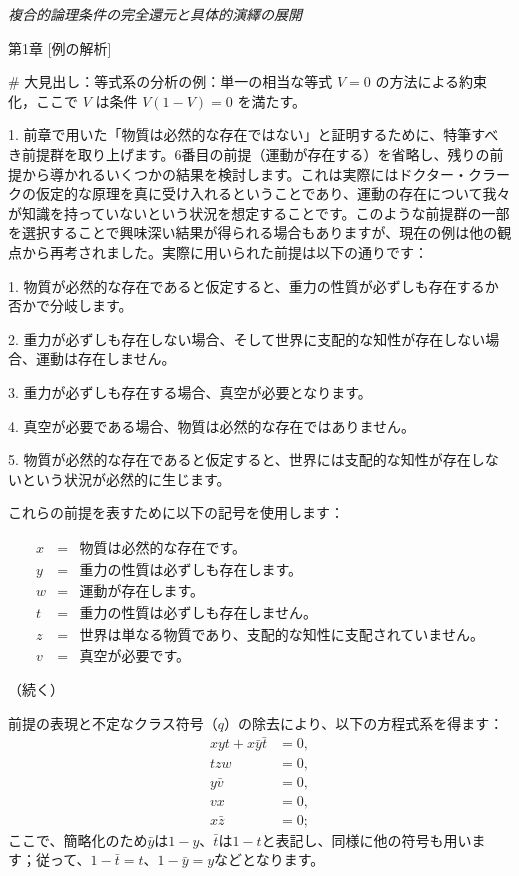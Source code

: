 \documentclass[a4paper,11pt,openany]{ltjsbook}
\begin{document}
\begin{center}
\large\textit{複合的論理条件の完全還元と具体的演繹の展開}
\end{center}
\vspace{4mm}

第1章 [例の解析]

\# 大見出し：等式系の分析の例：単一の相当な等式 \( V = 0 \) の方法による約束化，ここで \( V \) は条件 \( V(1-V) = 0 \) を満たす。

1. 前章で用いた「物質は必然的な存在ではない」と証明するために、特筆すべき前提群を取り上げます。6番目の前提（運動が存在する）を省略し、残りの前提から導かれるいくつかの結果を検討します。これは実際にはドクター・クラークの仮定的な原理を真に受け入れるということであり、運動の存在について我々が知識を持っていないという状況を想定することです。このような前提群の一部を選択することで興味深い結果が得られる場合もありますが、現在の例は他の観点から再考されました。実際に用いられた前提は以下の通りです：

1. 物質が必然的な存在であると仮定すると、重力の性質が必ずしも存在するか否かで分岐します。

2. 重力が必ずしも存在しない場合、そして世界に支配的な知性が存在しない場合、運動は存在しません。

3. 重力が必ずしも存在する場合、真空が必要となります。

4. 真空が必要である場合、物質は必然的な存在ではありません。

5. 物質が必然的な存在であると仮定すると、世界には支配的な知性が存在しないという状況が必然的に生じます。

これらの前提を表すために以下の記号を使用します：

\begin{eqnarray*}
  x &=& \text{物質は必然的な存在です。} \\
  y &=& \text{重力の性質は必ずしも存在します。} \\
  w &=& \text{運動が存在します。} \\
  t &=& \text{重力の性質は必ずしも存在しません。} \\
  z &=& \text{世界は単なる物質であり、支配的な知性に支配されていません。} \\
  v &=& \text{真空が必要です。}
\end{eqnarray*}

（続く）

前提の表現と不定なクラス符号（$q$）の除去により、以下の方程式系を得ます：
\begin{eqnarray*}
xyt + x\bar{y}\bar{t} &= 0,   \\
                  tzw &= 0,   \\
             y\bar{v} &= 0,   \\
                   vx &= 0,   \\
             x\bar{z} &= 0;
\end{eqnarray*}
ここで、簡略化のため$\bar{y}$は$1-y$、$\bar{t}$は$1-t$と表記し、同様に他の符号も用います；従って、$1-\bar{t} = t$、$1-\bar{y} = y$などとなります。
\end{document}
